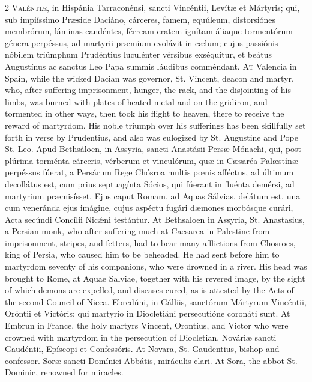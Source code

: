 \begin{paracol}{2}
\lettrine[lines=2]{V}{aléntiæ,} in Hispánia Tarraconénsi, sancti 
 Vincéntii, Levítæ et Mártyris; qui, sub impiíssimo Præside Daciáno, cárceres, 
 famem, equúleum, distorsiónes membrórum, láminas candéntes, férream cratem 
 ignítam áliaque tormentórum génera perpéssus, ad martyrii præmium evolávit 
 in cælum; cujus passiónis nóbilem triúmphum Prudéntius luculénter vérsibus 
 exséquitur, et beátus Augustínus ac sanctus Leo Papa summis láudibus 
 comméndant.
\switchcolumn
{}
\lettrine[lines=2]{A}{t} Valencia in Spain, while the wicked Dacian was governor, St. Vincent, 
 deacon and martyr, who, after suffering imprisonment, hunger, the rack, and 
 the disjointing of his limbs, was burned with plates of heated metal and on 
 the gridiron, and tormented in other ways, then took his flight to heaven, 
 there to receive the reward of martyrdom. His noble triumph over his 
 sufferings has been skillfully set forth in verse by Prudentius, and also 
 was eulogized by St. Augustine and Pope St. Leo.
\switchcolumn*
{}
Apud Bethsáloen, in Assyria, sancti Anastásii 
 Persæ Mónachi, qui, post plúrima torménta cárceris, vérberum et vinculórum, 
 quæ in Cæsaréa Palæstínæ perpéssus fúerat, a Persárum Rege Chósroa multis 
 pœnis afféctus, ad últimum decollátus est, cum prius septuagínta Sócios, qui 
 fúerant in fluénta demérsi, ad martyrium præmisísset. Ejus caput Romam, 
 ad Aquas Sálvias, delátum est, una cum veneránda ejus imágine, cujus aspéctu 
 fugári dæmones morbósque curári, Acta secúndi Concílii Nicǽni testántur.
\switchcolumn
{}
At Bethsaloen in Assyria, St. Anastasius, a Persian monk, who after 
 suffering much at Caesarea in Palestine from imprisonment, stripes, and 
 fetters, had to bear many afflictions from Chosroes, king of Persia, who 
 caused him to be beheaded. He had sent before him to martyrdom seventy 
 of his companions, who were drowned in a river. His head was brought 
 to Rome, at Aquae Salviae, together with his revered image, by the sight of 
 which demons are expelled, and diseases cured, as is attested by the Acts of 
 the second Council of Nicea.
\switchcolumn*
{}
Ebredúni, in Gálliis, sanctórum Mártyrum Vincéntii, Oróntii et Victóris; qui 
 martyrio in Diocletiáni persecutióne coronáti sunt.
\switchcolumn
{}
At Embrun in France, the holy martyrs Vincent, Orontius, and Victor who were 
 crowned with martyrdom in the persecution of Diocletian.
\switchcolumn*
{}
Nováriæ sancti Gaudéntii, Epíscopi et 
 Confessóris.
\switchcolumn
{}
At Novara, St. Gaudentius, bishop and confessor.
\switchcolumn*
{}
Soræ sancti Domínici Abbátis, miráculis clari.
\switchcolumn
{}
At Sora, the abbot St. Dominic, renowned for miracles.
\switchcolumn*
{}
\end{paracol}


